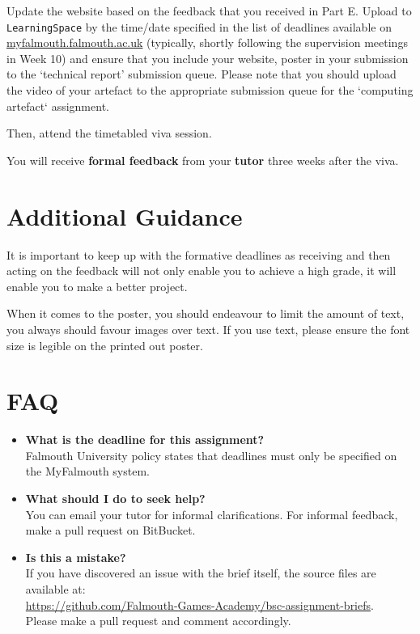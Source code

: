\documentclass{../../fal_assignment}
\begin{document}
Update the website based on the feedback that you received in Part E. Upload to \texttt{LearningSpace} by the time/date specified in the list of deadlines available on \url{myfalmouth.falmouth.ac.uk} (typically, shortly following the supervision meetings in Week 10) and ensure that you include your website, poster in your submission to the `technical report' submission queue. Please note that you should upload the video of your artefact to the appropriate submission queue for the `computing artefact` assignment. 

Then, attend the timetabled viva session.

You will receive \textbf{formal feedback} from your \textbf{tutor} three weeks after the viva.

\section*{Additional Guidance}

It is important to keep up with the formative deadlines as receiving and then
acting on the feedback will not only enable you to achieve a high grade, it
will enable you to make a better project.

When it comes to the poster, you should endeavour to limit the amount of text,
you always should favour images over text. If you use text, please ensure the
font size is legible on the printed out poster.

\section*{FAQ}

\begin{itemize}
	\item 	\textbf{What is the deadline for this assignment?} \\ 
    		Falmouth University policy states that deadlines must only be specified on the MyFalmouth system.
    		
	\item 	\textbf{What should I do to seek help?} \\ 
    		You can email your tutor for informal clarifications. For informal feedback, make a pull request on BitBucket. 
    		
    	\item 	\textbf{Is this a mistake?} \\ 	
    		If you have discovered an issue with the brief itself, the source files are available at: \\
    		\url{https://github.com/Falmouth-Games-Academy/bsc-assignment-briefs}.\\
    		 Please make a pull request and comment accordingly.
\end{itemize}
\end{document}

